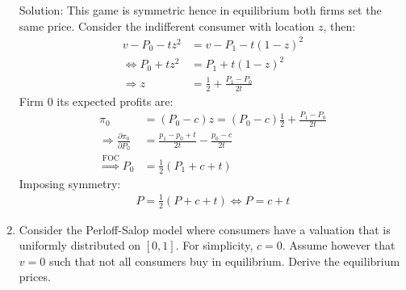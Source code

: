 \begin{enumerate}
	      Solution: This game is symmetric hence in equilibrium both firms set the same price.
	      Consider the indifferent consumer with location $z$, then:
	      \begin{align*}
		      v-P_0-tz^2                   & =v-P_1-t(1-z)^2                 \\
		      \Longleftrightarrow P_0+tz^2 & =P_1+t(1-z)^2                   \\
		      \Longrightarrow z            & =\frac{1}{2}+\frac{P_1-P_0}{2t}
	      \end{align*}
	      Firm 0 its expected profits are:
	      \begin{align*}
		      \pi_0                                             & =(P_0-c)z=(P_0-c)\frac{1}{2}+\frac{P_1-P_0}{2t} \\
		      \Longrightarrow\frac{\partial\pi_0}{\partial P_0} & =\frac{p_1-p_0+t}{2t}-\frac{p_0-c}{2t}          \\
		      \overset{\text{FOC}}{\Longrightarrow}P_0          & =\frac{1}{2}(P_1+c+t)
	      \end{align*}
	      Imposing symmetry:
	      \begin{align*}
		      P=\frac{1}{2}(P+c+t)\Longleftrightarrow P=c+t
	      \end{align*}
	\item Consider the Perloff-Salop model where consumers have a valuation that is uniformly
	      distributed on $[0, 1]$. For simplicity, $c = 0$. Assume however that $v = 0$ such
	      that not all consumers buy in equilibrium. Derive the equilibrium prices.


\end{enumerate}
